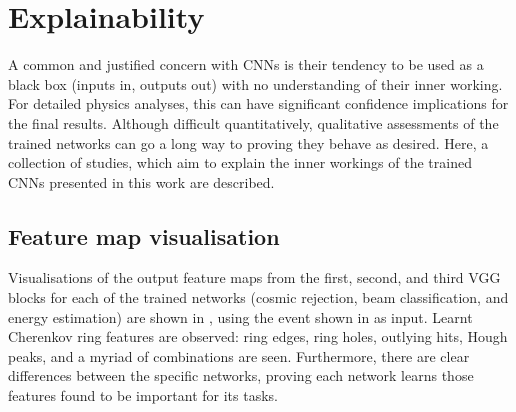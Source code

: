 \section{Explainability} %
\label{sec:results_explain} %

A common and justified concern with CNNs is their tendency to be used as a black box (inputs in,
outputs out) with no understanding of their inner working. For detailed physics analyses, this can
have significant confidence implications for the final results. Although difficult quantitatively,
qualitative assessments of the trained networks can go a long way to proving they behave as
desired. Here, a collection of studies, which aim to explain the inner workings of the trained
CNNs presented in this work are described.

\subsection{Feature map visualisation} %
\label{sec:results_explain_vis} %

Visualisations of the output feature maps from the first, second, and third VGG blocks for each of
the trained networks (cosmic rejection, beam classification, and energy estimation) are shown in
, using the event shown in 
as input. Learnt Cherenkov ring features are observed: ring edges, ring holes, outlying hits,
Hough peaks, and a myriad of combinations are seen. Furthermore, there are clear differences
between the specific networks, proving each network learns those features found to be important
for its tasks.

